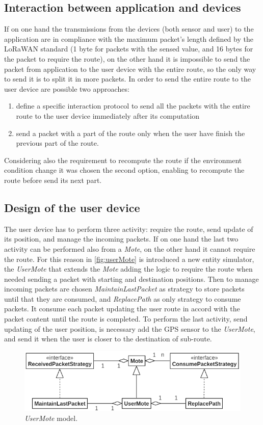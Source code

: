 \subsection*{Interaction between application and devices}
If on one hand the transmissions from the devices (both sensor and user) to the application are in compliance with the maximum packet's length defined by the LoRaWAN standard (1 byte for packets with the sensed value, and 16 bytes for the packet to require the route), on the other hand it is impossible to send the packet from application to the user device with the entire route, so the only way to send it is to split it in more packets.
In order to send the entire route to the user device are possible two approaches: 
\begin{enumerate}
    \item define a specific interaction protocol to send all the packets with the entire route to the user device immediately after its computation
    \item send a packet with a part of the route only when the user have finish the previous part of the route.
\end{enumerate}
Considering also the requirement to recompute the route if the environment condition change it was chosen the second option, enabling to recompute the route before send its next part.

\subsection*{Design of the user device}
The user device has to perform three activity: require the route, send update of its position, and manage the incoming packets.
If on one hand the last two activity can be performed also from a \textit{Mote}, on the other hand it cannot require the route.
For this reason in \autoref{fig:userMote} is introduced a new entity simulator, the \textit{UserMote} that extends the \textit{Mote} adding the logic to require the route when needed sending a packet with starting and destination positions.
Then to manage incoming packets are chosen \textit{MaintainLastPacket} as strategy to store packets until that they are consumed, and \textit{ReplacePath} as only strategy to consume packets. It consume each packet updating the user route in accord with the packet content until the route is completed.
To perform the last activity, send updating of the user position, is necessary add the GPS sensor to the \textit{UserMote}, and send it when the user is closer to the destination of sub-route.
% 
\begin{figure}[h]
    \centering
    \includegraphics{figures/userMote.png}
    \caption{\textit{UserMote} model.}
    \label{fig:userMote}
\end{figure}
% 

